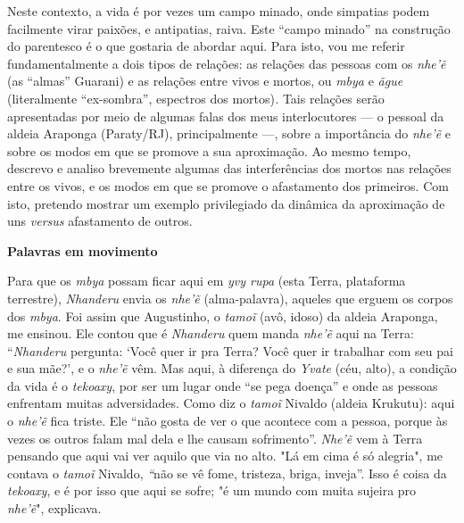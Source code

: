Neste contexto, a vida é por vezes um campo minado, onde simpatias podem
facilmente virar paixões, e antipatias, raiva. Este ``campo minado'' na
construção do parentesco é o que gostaria de abordar aqui. Para isto,
vou me referir fundamentalmente a dois tipos de relações: as relações
das pessoas com os \emph{nhe'ẽ} (as ``almas'' Guarani) e as relações
entre vivos e mortos, ou \emph{mbya} e \emph{ãgue} (literalmente
``ex-sombra'', espectros dos mortos)\emph{.} Tais relações serão
apresentadas por meio de algumas falas dos meus interlocutores --- o
pessoal da aldeia Araponga (Paraty/RJ), principalmente ---, sobre a
importância do \emph{nhe'ẽ} e sobre os modos em que se promove a sua
aproximação. Ao mesmo tempo, descrevo e analiso brevemente algumas das
interferências dos mortos nas relações entre os vivos, e os modos em que
se promove o afastamento dos primeiros. Com isto, pretendo mostrar um
exemplo privilegiado da dinâmica da aproximação de uns \emph{versus}
afastamento de outros.

\textbf{Palavras em movimento}

Para que os \emph{mbya} possam ficar aqui em \emph{yvy rupa} (esta
Terra, plataforma terrestre), \emph{Nhanderu} envia os \emph{nhe'ẽ}
(alma-palavra), aqueles que erguem os corpos dos \emph{mbya}. Foi assim
que Augustinho, o \emph{tamoĩ} (avô, idoso) da aldeia Araponga, me
ensinou. Ele contou que é \emph{Nhanderu} quem manda \emph{nhe'ẽ} aqui
na Terra: ``\emph{Nhanderu} pergunta: `Você quer ir pra Terra? Você quer
ir trabalhar com seu pai e sua mãe?', e o \emph{nhe'ẽ} vêm. Mas aqui, à
diferença do \emph{Yvate} (céu, alto), a condição da vida é o
\emph{tekoaxy}, por ser um lugar onde ``se pega doença'' e onde as
pessoas enfrentam muitas adversidades. Como diz o \emph{tamoĩ} Nivaldo
(aldeia Krukutu): aqui o \emph{nhe'ẽ} fica triste. Ele ``não gosta de
ver o que acontece com a pessoa, porque às vezes os outros falam mal
dela e lhe causam sofrimento''. \emph{Nhe'ẽ} vem à Terra pensando que
aqui vai ver aquilo que via no alto. "Lá em cima é só alegria", me
contava o \emph{tamoĩ} Nivaldo, \emph{``}não se vê fome, tristeza,
briga, inveja''. Isso é coisa da \emph{tekoaxy}, e é por isso que aqui
se sofre; "é um mundo com muita sujeira pro \emph{nhe'ẽ}", explicava.

